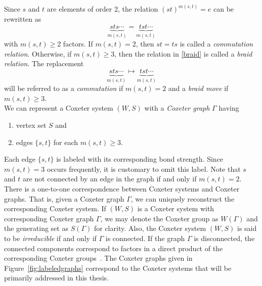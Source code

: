 Since $s$ and $t$ are elements of order 2, the relation $(st)^{m(s,t)}=e$ can be rewritten as
\begin{equation}\label{braid} 
	\underbrace{sts \cdots}_{m(s,t)}=\underbrace{tst\cdots}_{m(s,t)}
\end{equation}
with $m(s,t) \geq 2$ factors. If $m(s,t)=2$, then $st=ts$ is called a \emph{commutation relation}. Otherwise, if $m(s,t) \geq 3$, then the relation in \eqref{braid} is called a \emph{braid relation}. The replacement \[\underbrace{sts\cdots}_{m(s,t)} \mapsto  \underbrace{tst\cdots}_{m(s,t)}\] will be referred to as a \emph{commutation} if $m(s,t)=2$ and a \emph{braid move} if $m(s,t) \geq 3$.\\

We can represent a Coxeter system $(W,S)$ with a \emph{Coxeter graph} $\Gamma$ having
\begin{enumerate}[leftmargin=2cm]
\item vertex set $S$ and
\item edges $\{s, t\}$ for each $m(s,t) \geq 3$.	
\end{enumerate}

Each edge $\{s,t\}$ is labeled with its corresponding bond strength. Since $m(s,t)=3$ occurs frequently, it is customary to omit this label. Note that $s$ and $t$ are not connected by an edge in the graph if and only if $m(s,t)=2$. There is a one-to-one correspondence between Coxeter systems and Coxeter graphs. That is, given a Coxeter graph $\Gamma$, we can uniquely reconstruct the corresponding Coxeter system. If $(W,S)$ is a Coxeter system with corresponding Coxeter graph $\Gamma$, we may denote the Coxeter group as $W(\Gamma)$ and the generating set as $S(\Gamma)$ for clarity. Also, the Coxeter system $(W,S)$ is said to be \emph{irreducible} if and only if $\Gamma$ is connected. If the graph $\Gamma$ is disconnected, the connected components correspond to factors in a direct product of the corresponding Coxeter groups~\cite{Humphreys1990}. The Coxeter graphs given in Figure~\ref{fig:labeledgraphs} correspond to the Coxeter systems that will be primarily addressed in this thesis. 

